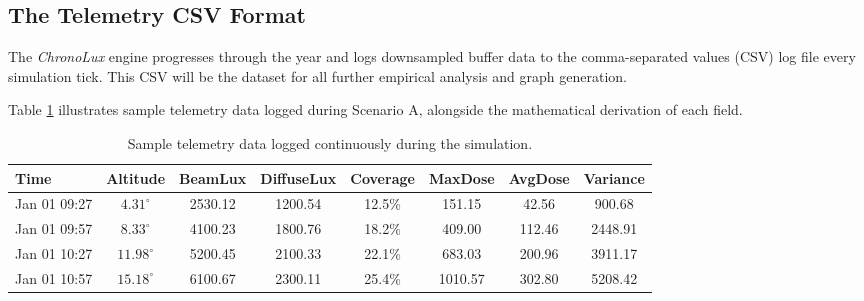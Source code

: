 \subsection{The Telemetry CSV Format}

The \textit{ChronoLux} engine progresses through the year and logs downsampled buffer data to the comma-separated values (CSV) log file every simulation tick. This CSV will be the dataset for all further empirical analysis and graph generation.

Table \ref{tab:csv_sample} illustrates sample telemetry data logged during Scenario A, alongside the mathematical derivation of each field.

\begin{table}[htbp]
    \centering
    \small
    \caption{Sample telemetry data logged continuously during the simulation.}
    \label{tab:csv_sample}
    \begin{tabular}{@{}l c c c c c c c@{}}
        \hline
        \textbf{Time} & \textbf{Altitude} & \textbf{BeamLux} & \textbf{DiffuseLux} & \textbf{Coverage} & \textbf{MaxDose} & \textbf{AvgDose} & \textbf{Variance} \\
        \hline
        Jan 01 09:27  & $4.31^\circ$      & 2530.12          & 1200.54             & 12.5\%            & 151.15           & 42.56            & 900.68            \\
        Jan 01 09:57  & $8.33^\circ$      & 4100.23          & 1800.76             & 18.2\%            & 409.00           & 112.46           & 2448.91           \\
        Jan 01 10:27  & $11.98^\circ$     & 5200.45          & 2100.33             & 22.1\%            & 683.03           & 200.96           & 3911.17           \\
        Jan 01 10:57  & $15.18^\circ$     & 6100.67          & 2300.11             & 25.4\%            & 1010.57          & 302.80           & 5208.42           \\
        \hline
    \end{tabular}
\end{table}

